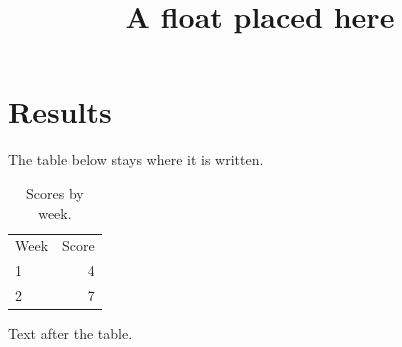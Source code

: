 \documentclass{article}
\title{A float placed here}
\begin{document}
\maketitle
\section{Results}
The table below stays where it is written.
\begin{table}[H]
  \centering
  \begin{tabular}{lr}
    Week & Score \\
    1 & 4 \\
    2 & 7
  \end{tabular}
  \caption{Scores by week.}
\end{table}
Text after the table.
\end{document}
